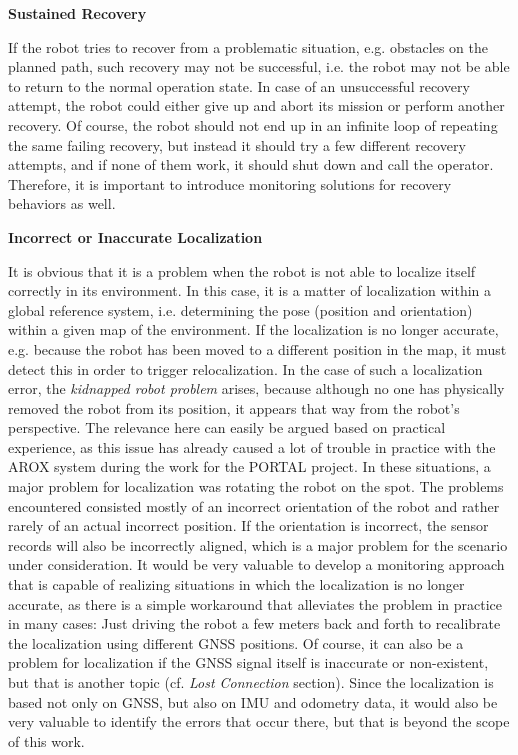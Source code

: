\documentclass[english, master, utf8]{base/thesis_KBS}
\begin{document}
\noindent
\textbf{Sustained Recovery}\newline

\noindent
If the robot tries to recover from a problematic situation, e.g. obstacles on the planned path, such recovery may not be successful, i.e. the robot may not be able
to return to the normal operation state. In case of an unsuccessful recovery attempt, the robot could either give up and abort its mission or perform another recovery.
Of course, the robot should not end up in an infinite loop of repeating the same failing recovery, but instead it should try a few different recovery attempts,
and if none of them work, it should shut down and call the operator. Therefore, it is important to introduce monitoring solutions for recovery behaviors as well.\newline

\noindent
\textbf{Incorrect or Inaccurate Localization}\newline

\noindent
It is obvious that it is a problem when the robot is not able to localize itself correctly in its environment.
In this case, it is a matter of localization within a global reference system, i.e. determining the pose (position and orientation) within a given map of the environment.
If the localization is no longer accurate, e.g. because the robot has been moved to a different position in the map, it must detect this in order to
trigger relocalization. In the case of such a localization error, the \textit{kidnapped robot problem} arises, because although no one has 
physically removed the robot from its position, it appears that way from the robot's perspective. \cite{Hertzberg:2012}
The relevance here can easily be argued based on practical experience, as this issue has already caused a lot of trouble in practice with the AROX system during 
the work for the PORTAL project. In these situations, a major problem for localization was rotating the robot on the spot.
The problems encountered consisted mostly of an incorrect orientation of the robot and rather rarely of an actual incorrect position.
If the orientation is incorrect, the sensor records will also be incorrectly aligned, which is a major problem for the scenario under consideration.
It would be very valuable to develop a monitoring  approach that is capable of realizing situations in which the localization is no longer accurate, as there is a
simple workaround that alleviates the problem in practice in many cases: Just driving the robot a few meters back and forth to recalibrate the localization 
using different GNSS positions. Of course, it can also be a problem for localization if the GNSS signal itself is inaccurate or non-existent, but that is another topic
(cf. \textit{Lost Connection} section). Since the localization is based not only on GNSS, but also on IMU and odometry data, it would also be very valuable to identify 
the errors that occur there, but that is beyond the scope of this work.\newline
\end{document}
